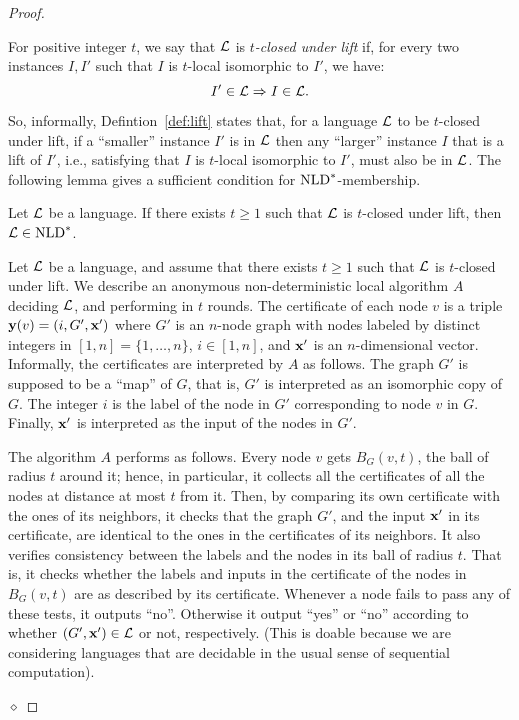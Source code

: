 \documentclass{llncs}
\newenvironment{proofofclaim}{\noindent {\em Proof.}}{\hfill $\diamond$ \medbreak}
\newcommand{\inp}{\mbox{\rm\bf x}}
\newcommand{\certif}{\mbox{\rm\bf y}}
\newcommand{\NLD}{\mbox{\rm NLD}}
\def\cL{{\cal L}}
\begin{document}
\begin{proof}
\begin{definition}
\label{def:lift}
For positive integer $t$, we say that $\cL$ is \emph{$t$-closed under lift }if, for every two instances $I,I'$ such that $I$ is $t$-local isomorphic to $I'$, we have: $$I' \in\cL \Rightarrow I \in \cL.$$
\end{definition}

So, informally, Defintion~\ref{def:lift} states that, for a language $\cL$ to be $t$-closed under lift, if a ``smaller''  instance $I'$ is in $\cL$ then any ``larger'' instance $I$ that is a lift of $I'$, i.e., satisfying that $I$ is $t$-local isomorphic to $I'$, must also be in $\cL$. The following lemma gives a sufficient condition for $\NLD^*$-membership. 

\begin{lemma}\label{claim:sufficient} 
Let $\cL$ be a language. If there exists $t \geq 1$ such that $\cL$ is $t$-closed under lift, then $\cL\in\NLD^*$. 
\end{lemma} 

\begin{proofofclaim}
Let $\cL$ be a language, and assume that there exists $t \geq 1$ such that $\cL$ is $t$-closed under lift. We describe an anonymous non-deterministic local algorithm $A$ deciding $\cL$,  and performing in $t$ rounds. The certificate of each node $v$ is a triple $\certif(v)=(i,G',\inp')$ where $G'$ is an $n$-node graph with nodes labeled by distinct integers in $[1,n]=\{1,\dots,n\}$, $i\in[1,n]$, and $\inp'$ is an $n$-dimensional vector.
Informally, the certificates are interpreted by $A$ as follows. The graph $G'$ is supposed to be a ``map'' of $G$, that is, $G'$ is interpreted as an isomorphic copy of $G$. The integer $i$ is the label of the node in $G'$ corresponding to node $v$ in $G$. Finally, $\inp'$ is interpreted as the input of the nodes in $G'$. 

The algorithm $A$ performs as follows. Every node $v$ gets $B_G(v,t)$, the ball of radius $t$ around it; hence, in particular, it collects all the certificates of all the nodes at distance at most $t$ from it. Then, by comparing its own certificate with the ones of its neighbors,  it checks that the graph $G'$, and the input $\inp'$ in its certificate, are identical to the ones in the certificates of its neighbors. It also verifies consistency between the labels and the nodes in its ball of radius $t$. That is, it checks whether the labels and inputs in the certificate of the nodes in $B_G(v,t)$ are as described by its  certificate. Whenever a node fails to pass any of these tests, it outputs ``no''. Otherwise it output ``yes'' or ``no'' according to whether $(G',\inp')\in\cL$ or not, respectively. (This is doable because we are considering languages that are decidable in the usual sense of sequential computation). 


\end{proofofclaim}
\end{proof}
\end{document}
